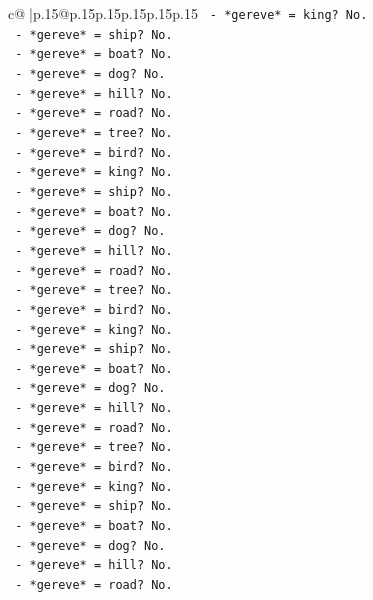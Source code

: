 \documentclass{article}
\begin{document}
{\begin{supertabular}{c@{$\;$}|p{.15\linewidth}@{}p{.15\linewidth}p{.15\linewidth}p{.15\linewidth}p{.15\linewidth}p{.15\linewidth}}
{{{\texttt{            {-} *gereve* = king? No.} \\
\texttt{            {-} *gereve* = ship? No.} \\
\texttt{            {-} *gereve* = boat? No.} \\
\texttt{            {-} *gereve* = dog? No.} \\
\texttt{            {-} *gereve* = hill? No.} \\
\texttt{            {-} *gereve* = road? No.} \\
\texttt{            {-} *gereve* = tree? No.} \\
\texttt{            {-} *gereve* = bird? No.} \\
\texttt{            {-} *gereve* = king? No.} \\
\texttt{            {-} *gereve* = ship? No.} \\
\texttt{            {-} *gereve* = boat? No.} \\
\texttt{            {-} *gereve* = dog? No.} \\
\texttt{            {-} *gereve* = hill? No.} \\
\texttt{            {-} *gereve* = road? No.} \\
\texttt{            {-} *gereve* = tree? No.} \\
\texttt{            {-} *gereve* = bird? No.} \\
\texttt{            {-} *gereve* = king? No.} \\
\texttt{            {-} *gereve* = ship? No.} \\
\texttt{            {-} *gereve* = boat? No.} \\
\texttt{            {-} *gereve* = dog? No.} \\
\texttt{            {-} *gereve* = hill? No.} \\
\texttt{            {-} *gereve* = road? No.} \\
\texttt{            {-} *gereve* = tree? No.} \\
\texttt{            {-} *gereve* = bird? No.} \\
\texttt{            {-} *gereve* = king? No.} \\
\texttt{            {-} *gereve* = ship? No.} \\
\texttt{            {-} *gereve* = boat? No.} \\
\texttt{            {-} *gereve* = dog? No.} \\
\texttt{            {-} *gereve* = hill? No.} \\
\texttt{            {-} *gereve* = road? No.} \\
}}}
\end{supertabular}}
\end{document}
